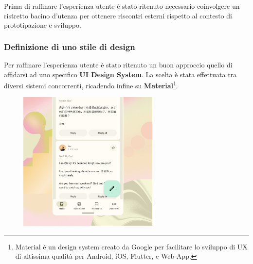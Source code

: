\documentclass{natourDoc}
\begin{document}
Prima di raffinare l'esperienza utente è stato ritenuto necessario coinvolgere un ristretto bacino d'utenza per ottenere riscontri esterni
rispetto al contesto di prototipazione e sviluppo.

\newpage

\subsubsection{Definizione di uno stile di design}
Per raffinare l'esperienza utente è stato ritenuto un buon approccio quello di affidarsi ad uno specifico \textbf{UI Design System}.
La scelta è stata effettuata tra diversi sistemi concorrenti, ricadendo infine su
\textbf{Material}\footnote{Material è un design system creato da Google per facilitare lo sviluppo di UX di altissima qualità per Android, iOS, Flutter, e Web-App.}.

\FloatBarrier
\begin{figure}[htbp!]
	\centering
	\includegraphics[height=7cm]{usability/material3.jpg}
\end{figure}
\FloatBarrier
\end{document}
